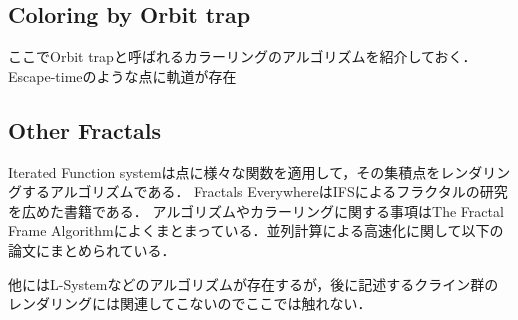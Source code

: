 \subsection{Coloring by Orbit trap}

ここでOrbit trapと呼ばれるカラーリングのアルゴリズムを紹介しておく．Escape-timeのような点に軌道が存在

\subsection{Other Fractals}

Iterated Function systemは点に様々な関数を適用して，その集積点をレンダリングするアルゴリズムである．
Fractals EverywhereはIFSによるフラクタルの研究を広めた書籍である．
アルゴリズムやカラーリングに関する事項はThe Fractal Frame Algorithmによくまとまっている．並列計算による高速化に関して以下の論文にまとめられている．

他にはL-Systemなどのアルゴリズムが存在するが，後に記述するクライン群のレンダリングには関連してこないのでここでは触れない．